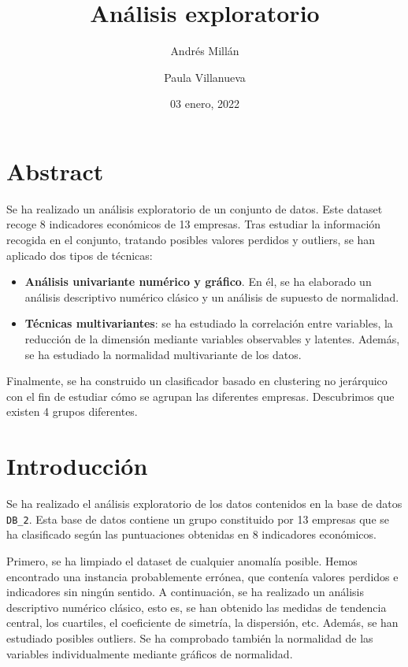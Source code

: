 \documentclass[
]{scrreprt}
\title{Análisis exploratorio}
\author{Andrés Millán \and Paula Villanueva}
\date{03 enero, 2022}
\providecommand{\tightlist}{%
  \setlength{\itemsep}{0pt}\setlength{\parskip}{0pt}}
\begin{document}
\maketitle

{
\hypersetup{linkcolor=}
\setcounter{tocdepth}{2}
\tableofcontents
}
\hypertarget{abstract}{%
\chapter{Abstract}\label{abstract}}

Se ha realizado un análisis exploratorio de un conjunto de datos. Este
dataset recoge 8 indicadores económicos de 13 empresas. Tras estudiar la
información recogida en el conjunto, tratando posibles valores perdidos
y outliers, se han aplicado dos tipos de técnicas:

\begin{itemize}
\tightlist
\item
  \textbf{Análisis univariante numérico y gráfico}. En él, se ha
  elaborado un análisis descriptivo numérico clásico y un análisis de
  supuesto de normalidad.
\item
  \textbf{Técnicas multivariantes}: se ha estudiado la correlación entre
  variables, la reducción de la dimensión mediante variables observables
  y latentes. Además, se ha estudiado la normalidad multivariante de los
  datos.
\end{itemize}

Finalmente, se ha construido un clasificador basado en clustering no
jerárquico con el fin de estudiar cómo se agrupan las diferentes
empresas. Descubrimos que existen 4 grupos diferentes.

\hypertarget{introducciuxf3n}{%
\chapter{Introducción}\label{introducciuxf3n}}

Se ha realizado el análisis exploratorio de los datos contenidos en la
base de datos \texttt{DB\_2}. Esta base de datos contiene un grupo
constituido por 13 empresas que se ha clasificado según las puntuaciones
obtenidas en 8 indicadores económicos.

Primero, se ha limpiado el dataset de cualquier anomalía posible. Hemos
encontrado una instancia probablemente errónea, que contenía valores
perdidos e indicadores sin ningún sentido. A continuación, se ha
realizado un análisis descriptivo numérico clásico, esto es, se han
obtenido las medidas de tendencia central, los cuartiles, el coeficiente
de simetría, la dispersión, etc. Además, se han estudiado posibles
outliers. Se ha comprobado también la normalidad de las variables
individualmente mediante gráficos de normalidad.
\end{document}
